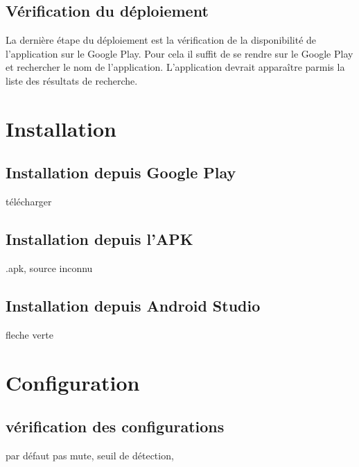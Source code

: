 \documentclass[UTF8]{EPURapport}
\begin{document}
\section{Vérification du déploiement}
La dernière étape du déploiement est la vérification de la disponibilité de l'application sur le Google Play. Pour cela il suffit de se rendre sur le Google Play et rechercher le nom de l'application. L'application devrait apparaître parmis la liste des résultats de recherche.

\chapter{Installation}
\section{Installation depuis Google Play}
télécharger
\section{Installation depuis l'APK}
.apk, source inconnu
\section{Installation depuis Android Studio}
fleche verte
\chapter{Configuration}
\section{vérification des configurations}
par défaut pas mute, seuil de détection, 

\annexes
\end{document}
